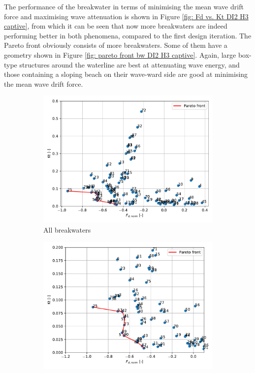 The performance of the breakwater in terms of minimising the mean wave drift force and maximising wave attenuation is shown in Figure \ref{fig: Fd vs. Kt DI2 H3 captive}, from which it can be seen that now more breakwaters are indeed performing better in both phenomena, compared to the first design iteration. The Pareto front obviously consists of more breakwaters. Some of them have a geometry shown in Figure \ref{fig: pareto front bw DI2 H3 captive}. Again, large box-type structures around the waterline are best at attenuating wave energy, and those containing a sloping beach on their wave-ward side are good at minimising the mean wave drift force. 


\begin{figure}[h]
    \centering
    \begin{subfigure}[b]{0.49\textwidth}
        \centering
        \includegraphics[width=\linewidth]{figures/ComFLOW/Results DI2/Fd_norm_VS_Kt_normal.pdf}
        \caption[]%
        {{\small All breakwaters}}    
        \label{fig: Fd vs. Kt DI2 H3 captive normal}
    \end{subfigure}
    \hfill
    \begin{subfigure}[b]{0.49\textwidth}  
        \centering 
        \includegraphics[width=\linewidth]{figures/ComFLOW/Results DI2/Fd_norm_VS_Kt_Pareto.pdf}

\end{subfigure}
\end{figure}
